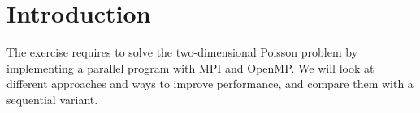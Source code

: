 \section{Introduction}

The exercise requires to solve the two-dimensional Poisson problem by
implementing a parallel program with MPI and OpenMP. We will look at different
approaches and ways to improve performance, and compare them with a sequential
variant.
